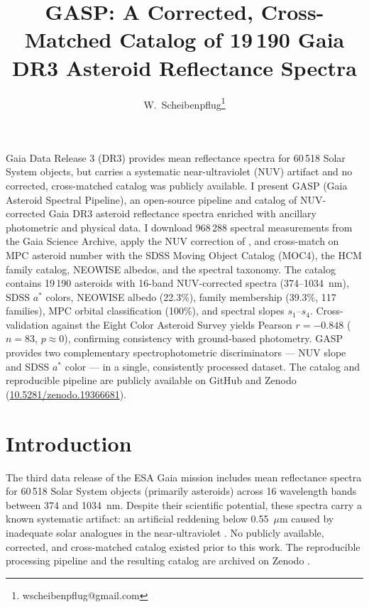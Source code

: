 \documentclass{aa}
\begin{document}
\title{GASP: A Corrected, Cross-Matched Catalog of 19\,190
       Gaia DR3 Asteroid Reflectance Spectra}

\author{W.~Scheibenpflug\thanks{wscheibenpflug@gmail.com}}


\abstract
{Gaia Data Release 3 (DR3) provides mean reflectance spectra for 60\,518
Solar System objects, but carries a systematic near-ultraviolet (NUV)
artifact and no corrected, cross-matched catalog was publicly available.}
{I present GASP (Gaia Asteroid Spectral Pipeline), an open-source pipeline and
catalog of NUV-corrected Gaia DR3 asteroid reflectance spectra enriched with
ancillary photometric and physical data.}
{I download 968\,288 spectral measurements from the Gaia Science Archive,
apply the NUV correction of \citet{TinautRuano2023}, and cross-match on MPC
asteroid number with the SDSS Moving Object Catalog (MOC4), the
\citet{Nesvorny2015} HCM family catalog, NEOWISE albedos, and the
\citet{Mahlke2022} spectral taxonomy.}
{The catalog contains 19\,190 asteroids with 16-band NUV-corrected spectra
(374--1034~nm), SDSS $a^*$ colors, NEOWISE albedo (22.3\%), family
membership (39.3\%, 117 families), MPC orbital classification (100\%), and
spectral slopes $s_1$--$s_4$. Cross-validation against the Eight Color
Asteroid Survey \citep[ECAS;][]{Zellner1985} yields Pearson $r = -0.848$
($n = 83$, $p \approx 0$), confirming consistency with ground-based
photometry.}
{GASP provides two complementary spectrophotometric discriminators --- NUV
slope and SDSS $a^*$ color --- in a single, consistently processed dataset.
The catalog and reproducible pipeline are publicly available on GitHub and
Zenodo (\href{https://doi.org/10.5281/zenodo.19366681}{10.5281/zenodo.19366681}).}

\maketitle


\section{Introduction}

The third data release of the ESA Gaia mission
\citep[Gaia DR3;][]{GaiaDR3_2023} includes mean reflectance
spectra for 60\,518 Solar System objects (primarily asteroids)
across 16 wavelength bands between 374 and 1034~nm. Despite
their scientific potential, these spectra carry a known
systematic artifact: an artificial reddening below 0.55~$\mu$m
caused by inadequate solar analogues in the near-ultraviolet
\citep[NUV;][]{TinautRuano2023}. No publicly available,
corrected, and cross-matched catalog existed prior to this work.
The reproducible processing pipeline and the resulting catalog are
archived on Zenodo \citep{scheibenpflug_2026_gasp}.
\end{document}
